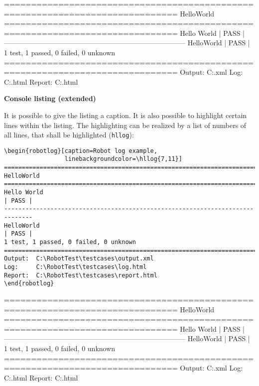 \documentclass[a4paper,10pt]{report}
\begin{document}
\vspace{2ex}

\begin{robotlog}
==============================================================================
HelloWorld
==============================================================================
Hello World                                                           | PASS |
------------------------------------------------------------------------------
HelloWorld                                                            | PASS |
1 test, 1 passed, 0 failed, 0 unknown
==============================================================================
Output:  C:\RobotTest\testcases\output.xml
Log:     C:\RobotTest\testcases\log.html
Report:  C:\RobotTest\testcases\report.html
\end{robotlog}

\vspace{2ex}

\textbf{Console listing (extended)}

It is possible to give the listing a caption. It is also possible to highlight certain lines within the listing. The highlighting can be realized by a list
of numbers of all lines, that shall be highlighted (\texttt{hllog}):

\vspace{2ex}

\begin{verbatim}
\begin{robotlog}[caption=Robot log example, 
                 linebackgroundcolor=\hllog{7,11}]
==============================================================================
HelloWorld
==============================================================================
Hello World                                                           | PASS |
------------------------------------------------------------------------------
HelloWorld                                                            | PASS |
1 test, 1 passed, 0 failed, 0 unknown
==============================================================================
Output:  C:\RobotTest\testcases\output.xml
Log:     C:\RobotTest\testcases\log.html
Report:  C:\RobotTest\testcases\report.html
\end{robotlog}
\end{verbatim}

\newpage

\begin{robotlog}[caption=Robot log example, 
                 linebackgroundcolor=\hllog{7,11}]
==============================================================================
HelloWorld
==============================================================================
Hello World                                                           | PASS |
------------------------------------------------------------------------------
HelloWorld                                                            | PASS |
1 test, 1 passed, 0 failed, 0 unknown
==============================================================================
Output:  C:\RobotTest\testcases\output.xml
Log:     C:\RobotTest\testcases\log.html
Report:  C:\RobotTest\testcases\report.html
\end{robotlog}
\end{document}
